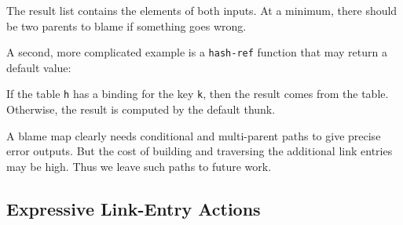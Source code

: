 \documentclass[ twoside,open=right,titlepage,numbers=noenddot,headinclude,%
                footinclude=true,cleardoublepage=empty,abstract=off,
                BCOR=5mm,paper=a4,fontsize=11pt,%
                ngerman,american,%
                parts,pdfspacing]{scrreprt}
\newcommand{\Scribtexttt}[1]{{\texttt{#1}}}
\newcommand{\Ssubsubsection}[2]{\subsubsection[#1]{#2}}
\renewcommand{\Ssubsubsection}[2]{\subsection[#1]{#2}}
\begin{document}
\noindent{}The result list contains the elements of both inputs.
At a minimum, there should be two parents to blame if something goes wrong.

A second, more complicated example is a \Scribtexttt{hash{-}ref} function that
 may return a default value:


\noindent{}If the table \Scribtexttt{h} has a binding for the key \Scribtexttt{k},
 then the result comes from the table.
Otherwise, the result is computed by the default thunk.

A blame map clearly needs conditional and multi{-}parent paths to give precise
 error outputs.
But the cost of building and traversing the additional link entries may be
 high.
Thus we leave such paths to future work.

\Ssubsubsection{Expressive Link{-}Entry Actions}{Expressive Link{-}Entry Actions}\label{t:x28part_x22Expressivex5fLinkx2dEntryx5fActionsx22x29}
\end{document}
